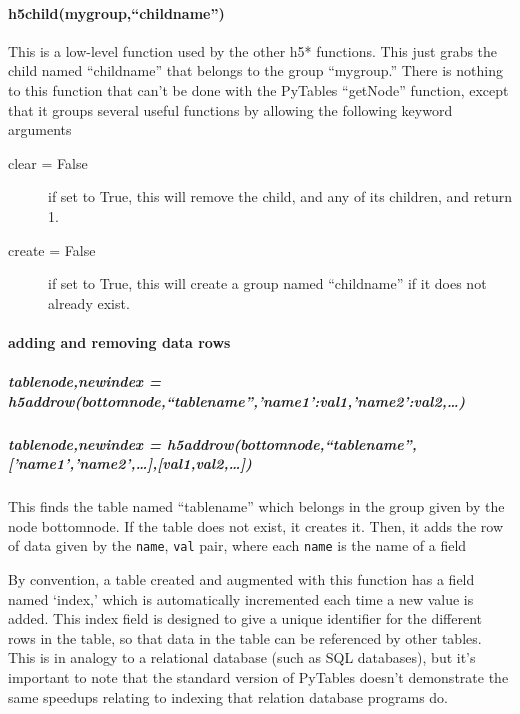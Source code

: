 \paragraph{h5child(mygroup,``childname'')}
This is a low-level function used by the other h5* functions.
This just grabs the child named ``childname'' that belongs
    to the group ``mygroup.''
There is nothing to this function that can't be done with
    the PyTables ``getNode'' function,
    except that it groups several useful functions
    by allowing the following keyword arguments
    \begin{mykwargs}
        \begin{description}
            \item[clear = False] if set to True, this will remove
                the child, and any of its children, and return 1.
            \item[create = False] if set to True, this will create
                a group named ``childname'' if it does not already exist.
        \end{description}
    \end{mykwargs}
\paragraph{adding and removing data rows}
\subparagraph{tablenode,newindex = h5addrow(bottomnode,``tablename'',{'name1':val1,'name2':val2,\ldots})}
\subparagraph{tablenode,newindex = h5addrow(bottomnode,``tablename'',['name1','name2',\ldots],[val1,val2,\ldots])}
This finds the table named ``tablename'' which belongs
    in the group given by the node bottomnode.
If the table does not exist, it creates it.
Then, it adds the row of data given by
    the \texttt{name}, \texttt{val} pair,
    where each \texttt{name} is the name of a field

By convention, a table created and augmented with this function
    has a field named `index,' which is automatically incremented
    each time a new value is added.
This index field is designed to give a unique identifier for
    the different rows in the table, so that data in the table
    can be referenced by other tables.
This is in analogy to a relational database
    (such as SQL databases),
    but it's important to note that the standard version
    of PyTables doesn't demonstrate the same speedups
    relating to indexing that relation database programs do.

